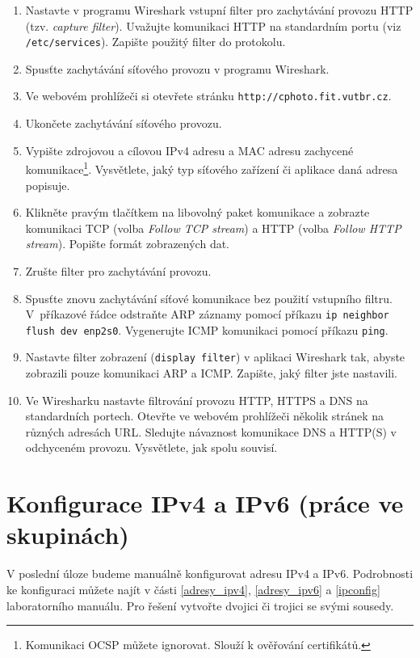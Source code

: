 \documentclass[a4paper,11pt]{article}
\begin{document}
\begin{enumerate}
  \item Nastavte v programu Wireshark vstupní filter pro zachytávání provozu HTTP (tzv. {\em capture filter}). Uvažujte komunikaci HTTP na standardním portu (viz {\tt /etc/services}). Zapište použitý filter do protokolu.
  \item Spusťte zachytávání síťového provozu v programu Wireshark.
  \item Ve webovém prohlížeči si otevřete stránku \texttt{http://cphoto.fit.vutbr.cz}.
  \item Ukončete zachytávání síťového provozu. 
  \item Vypište zdrojovou a cílovou IPv4 adresu a MAC adresu zachycené komunikace\footnote{Komunikaci OCSP můžete ignorovat. Slouží k ověřování certifikátů.}. Vysvětlete, jaký typ síťového zařízení či aplikace daná adresa popisuje.
  \item Klikněte pravým tlačítkem na libovolný paket komunikace a zobrazte komunikaci TCP (volba {\em Follow TCP stream}) a HTTP (volba {\em Follow HTTP stream}). Popište formát zobrazených dat. 
  \item Zrušte filter pro zachytávání provozu.
  \item Spusťte znovu zachytávání síťové komunikace bez použití vstupního filtru. V~příkazové řádce odstraňte ARP záznamy pomocí příkazu  \texttt{ip neighbor flush dev enp2s0}. Vygenerujte ICMP komunikaci pomocí příkazu {\tt ping}.
  \item Nastavte filter zobrazení ({\tt display filter}) v aplikaci Wireshark tak, abyste zobrazili pouze komunikaci ARP a ICMP. Zapište, jaký filter jste nastavili.
  \item Ve Wiresharku nastavte filtrování provozu HTTP, HTTPS a DNS na standardních portech. Otevřte ve webovém prohlížeči několik stránek na různých adresách URL. Sledujte návaznost komunikace DNS a HTTP(S) v odchyceném provozu. Vysvětlete, jak spolu souvisí. 
\end{enumerate}

\section{Konfigurace IPv4 a IPv6 (práce ve skupinách)}
V poslední úloze budeme manuálně konfigurovat adresu IPv4 a IPv6. Podrobnosti ke konfiguraci můžete najít v části \ref{adresy_ipv4}, \ref{adresy_ipv6} a \ref{ipconfig} laboratorního manuálu. Pro řešení vytvořte dvojici či trojici se svými sousedy.
\end{document}
